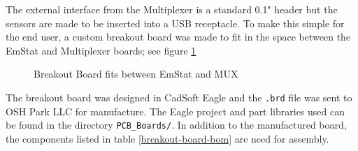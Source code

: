 \documentclass[DIV=calc, paper=letterpaper, fontsize=11pt, twocolumn]{scrartcl}	 %
\begin{document}
The external interface from the Multiplexer is a standard 0.1" header but the sensors are made to be inserted into a USB receptacle.
To make this simple for the end user,
a custom breakout board was made to fit in the space between the EmStat and Multiplexer boards;
see figure \ref{breakout-board-sandwich}

\begin{figure}[tb]
\centering
{}	\quad
{}
\caption{Breakout Board fits between EmStat and MUX}
\label{breakout-board-sandwich}
\end{figure}

The breakout board was designed in CadSoft Eagle and the \texttt{.brd} file was sent to OSH Park LLC for manufacture.
The Eagle project and part libraries used can be found in the directory \texttt{PCB\_Boards/}.
In addition to the manufactured board, the components listed in table \ref{breakout-board-bom} are need for assembly.

\begin{table}[ht]
\centering
\caption{Breakout Board Components}
\label{breakout-board-bom}
\end{table}
\end{document}
